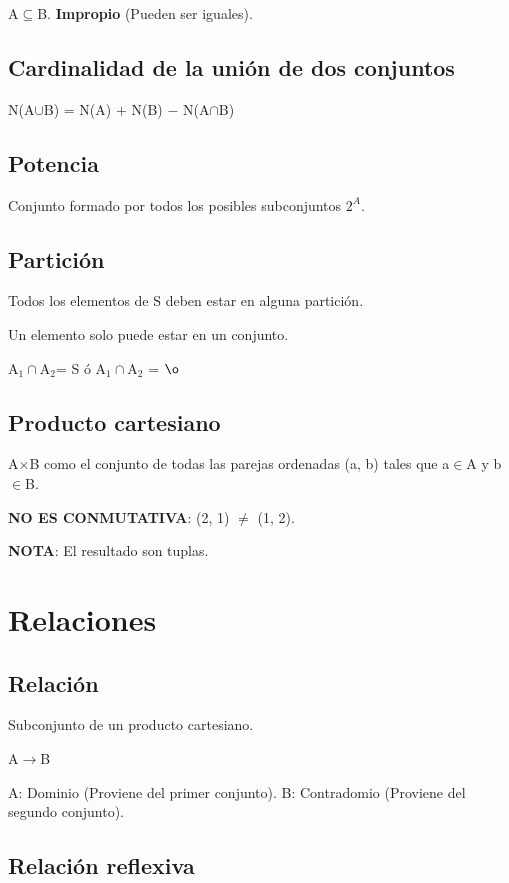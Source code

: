 \documentclass{article}
\begin{document}
A$\subseteq$B. \textbf{Impropio} (Pueden ser iguales).

\subsection{Cardinalidad de la unión de dos conjuntos}

N(A$\cup$B) = N(A) $+$ N(B) $-$ N(A$\cap$B)

\subsection{Potencia}

Conjunto formado por todos los posibles subconjuntos $2^A$.

\subsection{Partición}

Todos los elementos de S deben estar en alguna partición.

Un elemento solo puede estar en un conjunto.
\vspace{1em}

A$_1\cap$A$_2$= S ó A$_1\cap$A$_2$ = $\o$

\subsection{Producto cartesiano}

A$\times$B como el conjunto de todas las parejas ordenadas (a, b) tales que
a$\in$A y b$\in$B.

\textbf{NO ES CONMUTATIVA}: (2, 1) $\neq$ (1, 2).

\textbf{NOTA}: El resultado son tuplas.

\section{Relaciones}

\subsection{Relación}

Subconjunto de un producto cartesiano.

A$\rightarrow$B

A: Dominio (Proviene del primer conjunto).
B: Contradomio (Proviene del segundo conjunto).

\subsection{Relación reflexiva}
\end{document}
